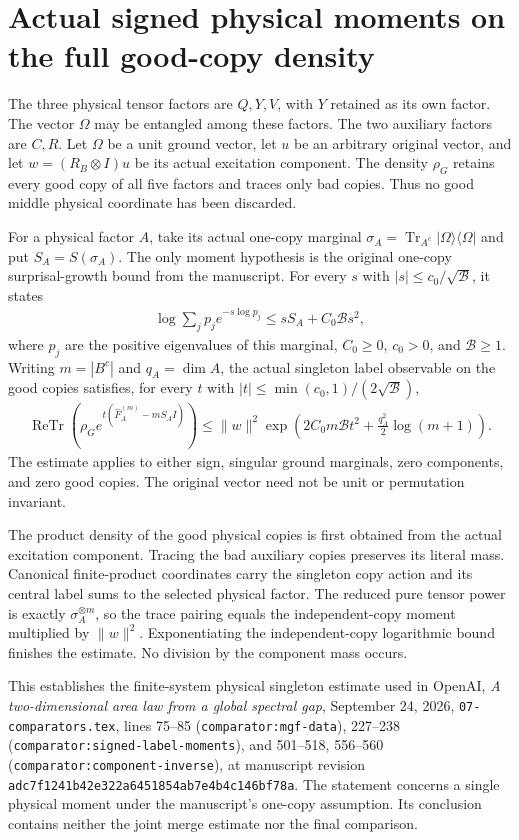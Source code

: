 \section{Actual signed physical moments on the full good-copy density}

The three physical tensor factors are $Q,Y,V$, with $Y$ retained as its own
factor. The vector $\Omega$ may be entangled among these factors.
The two auxiliary factors are $C,R$. Let $\Omega$ be a unit ground vector,
let $u$ be an arbitrary original vector, and let $w=(R_B\otimes I)u$ be its
actual excitation component. The density $\rho_G$ retains every good copy of
all five factors and traces only bad copies. Thus no good middle physical
coordinate has been discarded.

For a physical factor $A$, take its actual one-copy marginal
$\sigma_A=\operatorname{Tr}_{A^c}|\Omega\rangle\langle\Omega|$ and put
$S_A=S(\sigma_A)$. The only moment hypothesis is the original one-copy
surprisal-growth bound from the manuscript. For every $s$ with
$|s|\leq c_0/\sqrt{\mathcal B}$, it states
\begin{align}
 \log\sum_j p_j e^{-s\log p_j}
 \leq sS_A+C_0\mathcal B s^2,
\end{align}
where $p_j$ are the positive eigenvalues of this marginal, $C_0\geq0$,
$c_0>0$, and $\mathcal B\geq1$.
Writing $m=|B^c|$ and $q_A=\dim A$, the actual singleton label observable
on the good copies satisfies, for every $t$ with
$|t|\leq\min(c_0,1)/(2\sqrt{\mathcal B})$,
\begin{align}
 \operatorname{ReTr}\!\left(\rho_G
 e^{t(\widehat F_A^{(m)}-mS_AI)}\right)
 \leq \|w\|^2
 \exp\!\left(2C_0m\mathcal B t^2+\frac{q_A^2}{2}\log(m+1)\right).
\end{align}
The estimate applies to either sign, singular ground marginals, zero
components, and zero good copies. The original vector need not be unit
or permutation invariant.

The product density of the good physical copies is first obtained from the
actual excitation component. Tracing the bad auxiliary copies preserves
its literal mass. Canonical finite-product coordinates carry the singleton
copy action and its central label sums to the selected physical factor.
The reduced pure tensor power is exactly $\sigma_A^{\otimes m}$, so the trace
pairing equals the independent-copy moment multiplied by $\|w\|^2$.
Exponentiating the independent-copy logarithmic bound finishes the estimate.
No division by the component mass occurs.

This establishes the finite-system physical singleton estimate used in
OpenAI, \emph{A two-dimensional area law from a global spectral gap},
September 24, 2026, \texttt{07-comparators.tex}, lines 75--85
(\texttt{comparator:mgf-data}), 227--238
(\texttt{comparator:signed-label-moments}), and 501--518, 556--560
(\texttt{comparator:component-inverse}), at manuscript revision
\texttt{adc7f1241b42e322a6451854ab7e4b4c146bf78a}. The statement concerns a
single physical moment under the manuscript's one-copy assumption. Its
conclusion contains neither the joint merge estimate nor the final comparison.
